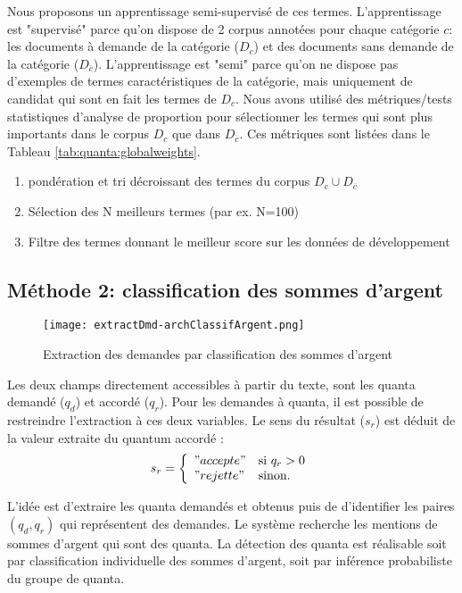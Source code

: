  Nous proposons un apprentissage semi-supervisé de ces termes. L'apprentissage est "supervisé" parce qu'on dispose de 2 corpus annotées pour chaque catégorie $c$: les documents à demande de la catégorie ($D_c$) et des documents sans demande de la catégorie ($D_{\overline{c}}$). L'apprentissage est "semi" parce qu'on ne dispose pas d'exemples de termes caractéristiques de la catégorie, mais uniquement de candidat qui sont en fait les termes de $D_c$. Nous avons utilisé des métriques/tests statistiques d'analyse de proportion pour sélectionner les termes qui sont plus importants dans le corpus $D_c$ que dans $D_{\overline{c}}$. Ces métriques sont listées dans le Tableau \ref{tab:quanta:globalweights}.
 
 \begin{enumerate}
 	\item  pondération et tri décroissant des termes du corpus $D_c \cup D_{\overline{c}}$
 	\item  Sélection des N meilleurs termes (par ex. N=100)
 	\item Filtre des termes donnant le meilleur score sur les données de développement
 \end{enumerate}




\subsection{Méthode 2: classification des sommes d'argent}

\begin{figure}[!htb]
 \texttt{[image: extractDmd-archClassifArgent.png]}
 \caption{Extraction des demandes par classification des sommes d'argent}\label{fig:quanta:classif}
\end{figure}

Les deux champs directement accessibles à partir du texte, sont les quanta demandé ($q_d$) et accordé ($q_r$). Pour les demandes à quanta, il est possible de restreindre l'extraction à ces deux variables. Le sens du résultat ($s_r$) est déduit de la valeur extraite du quantum accordé : \[s_r = \left\lbrace \begin{array}{ll}
"accepte" & \text{si } q_r > 0 \\
"rejette" & \text{sinon.} \end{array} \right.\]

L'idée est d'extraire les quanta demandés et obtenus puis de d'identifier les paires $(q_d, q_r)$ qui représentent des demandes. Le système recherche les mentions de sommes d'argent qui sont des quanta. La  détection des quanta est réalisable soit par classification individuelle des sommes d'argent, soit par inférence probabiliste du groupe de quanta. 


